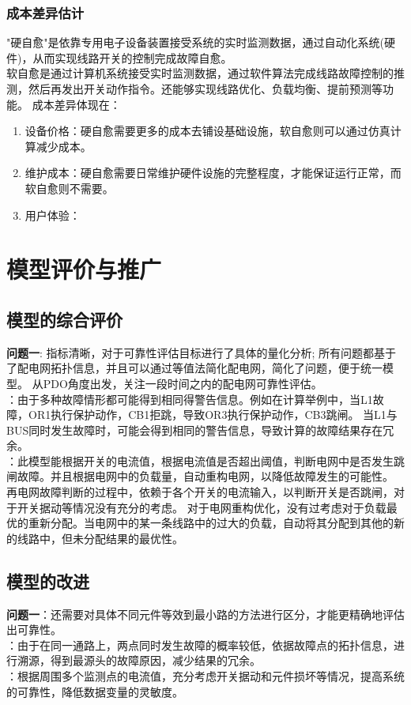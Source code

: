 \documentclass[withoutpreface,bwprint]{cumcmthesis} %
\begin{document}
\subsubsection{成本差异估计}
"硬自愈"是依靠专用电子设备装置接受系统的实时监测数据，通过自动化系统(硬件)，从而实现线路开关的控制完成故障自愈。\\
\indent 软自愈是通过计算机系统接受实时监测数据，通过软件算法完成线路故障控制的推测，然后再发出开关动作指令。还能够实现线路优化、负载均衡、提前预测等功能。
\indent 成本差异体现在：
\begin{enumerate}
    \item 设备价格：硬自愈需要更多的成本去铺设基础设施，软自愈则可以通过仿真计算减少成本。
    \item 维护成本：硬自愈需要日常维护硬件设施的完整程度，才能保证运行正常，而软自愈则不需要。
    \item 用户体验：
\end{enumerate}

\section{模型评价与推广}
\subsection{模型的综合评价}

{\bf 问题一}:
     指标清晰，对于可靠性评估目标进行了具体的量化分析;
     所有问题都基于了配电网拓扑信息，并且可以通过等值法简化配电网，简化了问题，便于统一模型。
    从PDO角度出发，关注一段时间之内的配电网可靠性评估。\\
：由于多种故障情形都可能得到相同得警告信息。例如在计算举例中，当L1故障，OR1执行保护动作，CB1拒跳，导致OR3执行保护动作，CB3跳闸。
当L1与BUS同时发生故障时，可能会得到相同的警告信息，导致计算的故障结果存在冗余。\\
：此模型能根据开关的电流值，根据电流值是否超出阈值，判断电网中是否发生跳闸故障。并且根据电网中的负载量，自动重构电网，以降低故障发生的可能性。
再电网故障判断的过程中，依赖于各个开关的电流输入，以判断开关是否跳闸，对于开关据动等情况没有充分的考虑。
对于电网重构优化，没有过考虑对于负载最优的重新分配。当电网中的某一条线路中的过大的负载，自动将其分配到其他的新的线路中，但未分配结果的最优性。

 



\subsection{模型的改进}
{\bf 问题一}：还需要对具体不同元件等效到最小路的方法进行区分，才能更精确地评估出可靠性。\\
：由于在同一通路上，两点同时发生故障的概率较低，依据故障点的拓扑信息，进行溯源，得到最源头的故障原因，减少结果的冗余。\\
：根据周围多个监测点的电流值，充分考虑开关据动和元件损坏等情况，提高系统的可靠性，降低数据变量的灵敏度。
\end{document}
